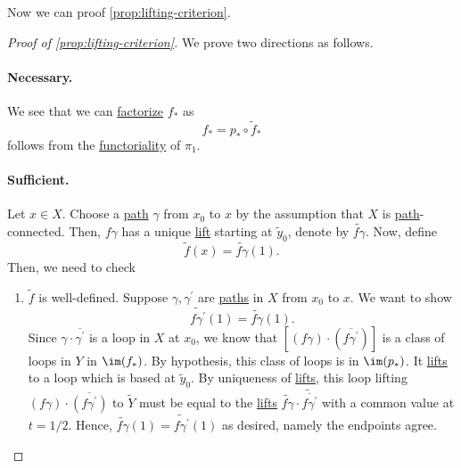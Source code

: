 \par Now we can proof \autoref{prop:lifting-criterion}.
\begin{proof}[Proof of \autoref{prop:lifting-criterion}]\let\qed\relax
	We prove two directions as follows.
	\paragraph{Necessary.} We see that we can \hyperref[def:factorization]{factorize} \(f_\ast\) as
	\[
		f_\ast = p_\ast \circ \widetilde{f} _\ast
	\]
	follows from the \hyperref[def:functor]{functoriality} of \(\pi _1\).
	\paragraph{Sufficient.} Let \(x\in X\). Choose a \hyperref[def:path]{path} \(\gamma\) from \(x_0\) to \(x\) by the assumption that \(X\) is \hyperref[def:path]{path}-connected.
	Then, \(f \gamma \) has a unique \hyperref[def:lift]{lift} starting at \(\widetilde{y} _0\), denote by \(\widetilde{f\gamma}\).
	Now, define
	\[
		\widetilde{f} (x) = \widetilde{f \gamma } (1).
	\]
	Then, we need to check
	\begin{enumerate}
		\item \(\widetilde{f} \) is well-defined. Suppose \(\gamma , \gamma ^\prime \) are \hyperref[def:path]{paths} in \(X\) from \(x_0\)
		      to \(x\). We want to show
		      \[
			      \widetilde{f \gamma^\prime} (1) = \widetilde{f \gamma } (1).
		      \]
		      Since \(\gamma \cdot \overline{\gamma^\prime}\) is a loop in \(X\) at \(x_{0}\), we know that \([(f \gamma)\cdot (\overline{f \gamma ^\prime}) ]\) is a class of
		      loops in \(Y\) in \(\im  (f_\ast)\). By hypothesis, this class of loops is in \(\im  (p_*)\).
		      It \hyperref[prop:homotopy-lifting-property]{lifts} to a loop which is based at \(\widetilde{y} _0\). By uniqueness of
		      \hyperref[prop:homotopy-lifting-property]{lifts}, this loop lifting \((f \gamma )\cdot \overline{(f \gamma ^\prime )}\) to \(\widetilde{Y} \)
		      must be equal to the \hyperref[prop:homotopy-lifting-property]{lifts} \(\widetilde{f \gamma }\cdot \widetilde{\overline{f \gamma ^\prime }}  \)
		      with a common value at \(t = 1 / 2\). Hence, \(\widetilde{f \gamma }(1) = \widetilde{f \gamma ^\prime }(1)\) as desired, namely the endpoints agree.
		      \begin{figure}[H]
			      \centering
			      \label{fig:pf:prop:lifting-criterion}
		      \end{figure}
	\end{enumerate}
\end{proof}